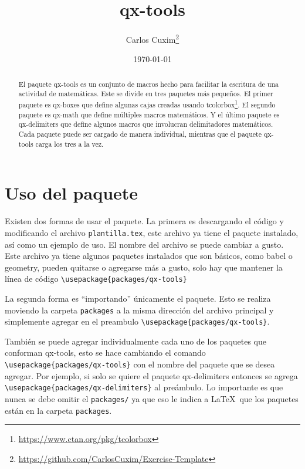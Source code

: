 \documentclass[11pt]{article}
\title{\textsf{qx-tools}}
\author{Carlos Cuxim\footnote{\url{https://github.com/CarlosCuxim/Exercise-Template}}}
\date{\today}
\begin{document}
\maketitle

\begin{abstract}
  El paquete \textsf{qx-tools} es un conjunto de macros hecho para facilitar la escritura de una actividad de matemáticas. Este se divide en tres paquetes más pequeños. El primer paquete es \textsf{qx-boxes} que define algunas cajas creadas usando \textsf{tcolorbox}\footnote{\url{https://www.ctan.org/pkg/tcolorbox}}. El segundo paquete es \textsf{qx-math} que define múltiples macros matemáticos. Y el último paquete es \textsf{qx-delimiters} que define algunos macros que involucran delimitadores matemáticos. Cada paquete puede ser cargado de manera individual, mientras que el paquete \textsf{qx-tools} carga los tres a la vez.
\end{abstract}




\section{Uso del paquete}

Existen dos formas de usar el paquete. La primera es descargando el código y modificando el archivo \texttt{plantilla.tex}, este archivo ya tiene el paquete instalado, así como un ejemplo de uso. El nombre del archivo se puede cambiar a gusto. Este archivo ya tiene algunos paquetes instalados que son básicos, como \textsf{babel} o \textsf{geometry}, pueden quitarse o agregarse más a gusto, solo hay que mantener la línea de código \verb|\usepackage{packages/qx-tools}|

La segunda forma es ``importando'' únicamente el paquete. Esto se realiza moviendo la carpeta \texttt{packages} a la misma dirección del archivo principal y simplemente agregar en el preambulo \verb|\usepackage{packages/qx-tools}|.

También se puede agregar individualmente cada uno de los paquetes que conforman \textsf{qx-tools}, esto se hace cambiando el comando \verb|\usepackage{packages/qx-tools}| con el nombre del paquete que se desea agregar. Por ejemplo, si solo se quiere el paquete \textsf{qx-delimiters} entonces se agrega \verb|\usepackage{packages/qx-delimiters}| al preámbulo. Lo importante es que nunca se debe omitir el \texttt{packages/} ya que eso le indica a \LaTeX\ que los paquetes están en la carpeta \texttt{packages}.
\end{document}
